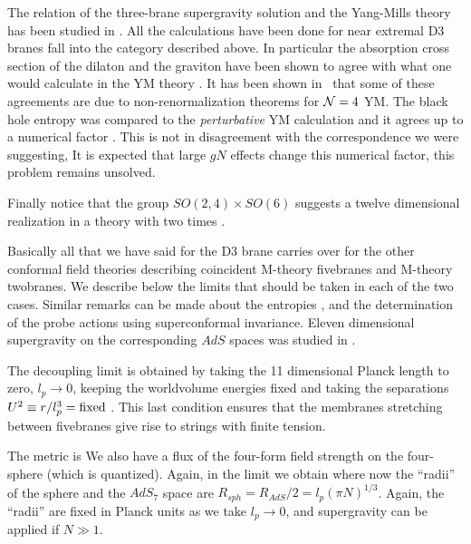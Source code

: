 The relation of the 
 three-brane supergravity solution  and the Yang-Mills theory
has been studied in 
 . All the calculations
have been done for near extremal D3 branes  fall into the 
category described above. In particular the absorption cross section
of the dilaton and the graviton have been shown to agree with 
what one would calculate in the YM theory . 
It has been shown in \dtnren\ that some of these agreements are due
to non-renormalization theorems for ${\cal N} =4 $ YM. 
The black hole entropy was compared to the {\it perturbative} YM
calculation
and it agrees up to a numerical factor \entrothree . 
This is not in disagreement with the correspondence we were suggesting, 
It is expected that large $gN$ effects change this numerical 
factor, this  problem  remains unsolved. 


Finally notice that  the group $SO(2,4)\times SO(6)$ suggests a
twelve dimensional realization in a theory with two times \vafaf . 














Basically all that we have said for the D3 brane carries over for the 
other  conformal field theories  describing 
coincident M-theory fivebranes and M-theory twobranes.
We describe below the limits that should  be taken in each of the two
cases. 
Similar remarks can be made about the entropies \kt , and the
determination of the probe actions using superconformal invariance.
Eleven dimensional supergravity on the corresponding $AdS$ spaces
was studied in .


 


The decoupling limit is obtained by taking the 11 dimensional Planck length
 to zero, $l_p \to 0$, keeping the worldvolume energies fixed and 
taking the separations $U^2 \equiv r/l_p^3 = {\rm fixed}$ \andyfive .
 This last condition 
ensures that the membranes stretching between fivebranes give rise to
 strings
with finite tension. 

The metric is
\eqn{}
We also have a flux of the four-form field strength on the four-sphere (which is quantized). 
Again, in the limit we obtain
\eqn{}
where now the ``radii''  of the sphere and the $AdS_7$ space are
$R_{sph} = R_{AdS}/2 = l_p  (\pi N)^{1/3} $. 
Again, the ``radii''  are fixed in Planck units
as we take $l_p \to 0$, and supergravity can be applied if $N \gg 1$.


